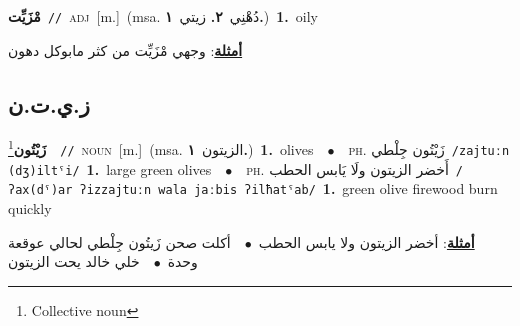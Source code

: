 \documentclass[10pt,a4paper,twoside]{article} %
\begin{document}
\begin{multicols}{2}
{\setlength\topsep{0pt}\textbf{\foreignlanguage{arabic}{مْزَيِّت}}\ {\color{gray}\texttt{//}\color{black}}\ \textsc{adj}\ [m.]\ \color{gray}(msa. \foreignlanguage{arabic}{دُهْنِي}~\foreignlanguage{arabic}{\textbf{٢.}}  \foreignlanguage{arabic}{زيتي}~\foreignlanguage{arabic}{\textbf{١.}})\color{black}\ \textbf{1.}~oily\  \begin{flushright}\color{gray}\foreignlanguage{arabic}{\textbf{\underline{\foreignlanguage{arabic}{أمثلة}}}: وجهي مْزَيِّت من كثر مابوكل دهون}\end{flushright}\color{black}} \vspace{2mm}

\vspace{-3mm}
\subsection*{\color{blue}\foreignlanguage{arabic}{ز.ي.ت.ن}\color{blue}{}} 

{\setlength\topsep{0pt}\textbf{\foreignlanguage{arabic}{زَيْتُون}}\footnote{Collective noun}\ \ {\color{gray}\texttt{//}\color{black}}\ \textsc{noun}\ [m.]\ \color{gray}(msa. \foreignlanguage{arabic}{الزيتون}~\foreignlanguage{arabic}{\textbf{١.}})\color{black}\ \textbf{1.}~olives\ \ $\bullet$\ \ \textsc{ph.} \color{gray} \foreignlanguage{arabic}{زَيْتُون جِلْطي}\color{black}\ {\color{gray}\texttt{/{\sffamily zajtuːn (dʒ)iltˤi}/}\color{black}}\ \textbf{1.}~large green olives\ \ $\bullet$\ \ \textsc{ph.} \color{gray} \foreignlanguage{arabic}{أَخضر الزيتون ولَا يَابس الحطب}\color{black}\ {\color{gray}\texttt{/{\sffamily ʔax(dˤ)ar ʔizzajtuːn wala jaːbis ʔilħatˤab}/}\color{black}}\ \textbf{1.}~green olive firewood burn quickly\  \begin{flushright}\color{gray}\foreignlanguage{arabic}{\textbf{\underline{\foreignlanguage{arabic}{أمثلة}}}: أخضر الزيتون ولا يابس الحطب\ $\bullet$\ \  أكلت صحن زَيتُون جِلْطي لحالي عوقعة وحدة\ $\bullet$\ \  خلي خالد يحت الزيتون}\end{flushright}\color{black}} \vspace{2mm}


\end{multicols}
\end{document}
